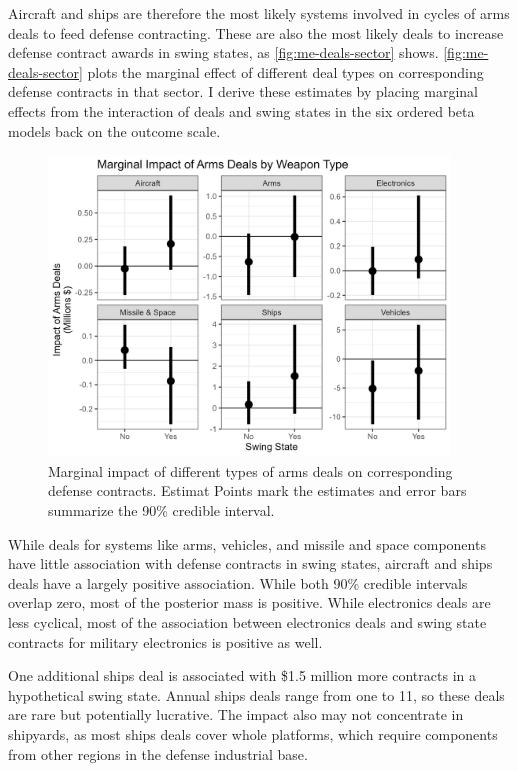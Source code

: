 \documentclass[12pt]{article}
\begin{document}
Aircraft and ships are therefore the most likely systems involved in cycles of arms deals to feed defense contracting. 
These are also the most likely deals to increase defense contract awards in swing states, as \autoref{fig:me-deals-sector} shows. 
\autoref{fig:me-deals-sector} plots the marginal effect of different deal types on corresponding defense contracts in that sector. 
I derive these estimates by placing marginal effects from the interaction of deals and swing states in the six ordered beta models back on the outcome scale. 


\begin{figure}[htpb]
	\centering
		\includegraphics[width=0.95\textwidth]{../figures/me-deals-sector.png}
	\caption{Marginal impact of different types of arms deals on corresponding defense contracts. Estimat Points mark the estimates and error bars summarize the 90\% credible interval.}
	\label{fig:me-deals-sector}
\end{figure}


While deals for systems like arms, vehicles, and missile and space components have little association with defense contracts in swing states, aircraft and ships deals have a largely positive association.
While both 90\% credible intervals overlap zero, most of the posterior mass is positive. 
While electronics deals are less cyclical, most of the association between electronics deals and swing state contracts for military electronics is positive as well.

One additional ships deal is associated with \$1.5 million more contracts in a hypothetical swing state. 
Annual ships deals range from one to 11, so these deals are rare but potentially lucrative. 
The impact also may not concentrate in shipyards, as most ships deals cover whole platforms, which require components from other regions in the defense industrial base. 
\end{document}
